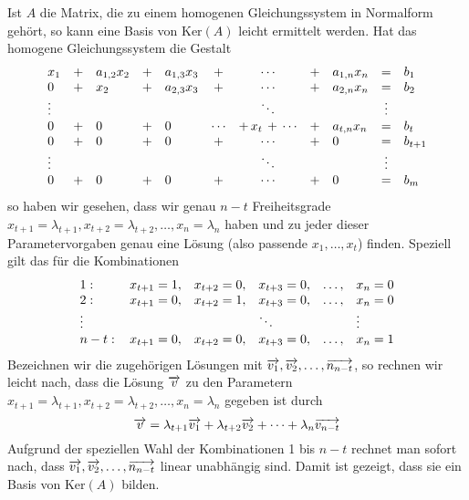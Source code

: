 \begin{notiz}\label{ker_normalform} Ist $A$ die Matrix, die zu einem homogenen 
Gleichungssystem in Normalform gehört, so kann eine Basis von $\text{Ker}(A)$ 
leicht ermittelt werden. Hat das homogene Gleichungssystem die Gestalt
  	$$ \begin{array} {l c l c l c c c l c l }
  	x_1 & + & a_{1,2} x_2 & + & a_{1,3} x_3 & + & \cdots & + & a_{1,n} x_n & = & b_1 \\
  	0 & + &  x_2 &  + & a_{2,3} x_3 & + & \cdots & + & a_{2,n} x_n & = & b_2 \\
 	\vdots & & &  & & & \ddots & & & \vdots \\
  	0 & + & 0 & + & 0 &  \cdots &  + \, x_t \, +  \, \cdots & + & a_{t,n} x_n & = & b_t \\  
  	0 & + & 0 & + & 0 & + & \cdots & + & 0 & = & b_{t+1} \\
  	\vdots & &  & & & & \ddots  & & & \vdots \\
  	0 & + & 0 & + & 0 & + & \cdots & + & 0 & = & b_m 
  	\end{array} $$
so haben wir gesehen, dass wir genau $n-t$ Freiheitsgrade $x_{t+1} = \lambda_{t+1}, 
x_{t+2} = \lambda_{t+2}, \ldots, x_n = \lambda_n$ haben und zu jeder dieser 
Parametervorgaben genau eine Lösung (also passende $x_1, \ldots,  x_t$) finden. 
Speziell gilt das für die Kombinationen
  	$$ \begin{array}{l l l l c l}
  	1: & x_{t+1} = 1, & x_{t+2} = 0, & x_{t+3} = 0, & \ldots, & x_{n} = 0 \\
  	2: & x_{t+1} = 0, & x_{t+2} = 1, & x_{t+3} = 0, & \ldots, & x_{n} = 0 \\
  	\vdots & & & \ddots & & \vdots \\
  	n-t: \, & x_{t+1} = 0, & x_{t+2} = 0, & x_{t+3} = 0, & \ldots, & x_n = 1
  	\end{array} $$
Bezeichnen wir die zugehörigen Lösungen mit $\overrightarrow{v_1}, 
\overrightarrow{v_2}, \ldots , \overrightarrow{n_{n-t}}$, so rechnen wir leicht nach, 
dass die Lösung $\overrightarrow{v}$ zu den Parametern $x_{t+1} = \lambda_{t+1}, 
x_{t+2} = \lambda_{t+2}, \ldots, x_n = \lambda_n$ gegeben ist durch 
  	$$ \overrightarrow{v} = \lambda_{t+1} \overrightarrow{v_1} + 
 	\lambda_{t+2} \overrightarrow{v_2} + \cdots + \lambda_n \overrightarrow{v_{n-t}} $$
Aufgrund der speziellen Wahl der Kombinationen 1 bis $n-t$ rechnet man sofort nach, 
dass $\overrightarrow{v_1}, \overrightarrow{v_2}, \ldots , \overrightarrow{n_{n-t}}$ 
linear unabhängig sind. Damit ist gezeigt, dass sie ein Basis von 
$\textrm{Ker}(A)$ bilden.
\end{notiz}

